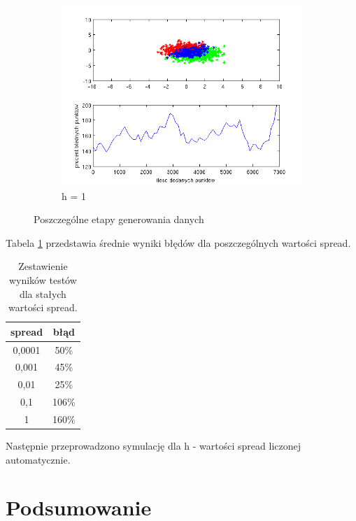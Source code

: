 \documentclass[10pt,a4paper]{article}
\begin{document}
\begin{figure}[h]
  \begin{center}
  \begin{subfigure}[b]{0.5\textwidth}
    \includegraphics[width=\textwidth]{test_h1.png}
    \caption{h = 1}
  \end{subfigure}
  \end{center}
  
  \caption{Poszczególne etapy generowania danych}
  \label{test_h}
  
\end{figure}

Tabela \ref{h_table} przedstawia średnie wyniki błędów dla poszczególnych wartości spread. 

\begin{table}[H]
\centering
\begin{tabular}{|c|c|}
\hline
spread & błąd \\
\hline
0,0001 & 50\%  \\
\hline
0,001 & 45\%  \\
\hline
0,01 & 25\%  \\
\hline
0,1 & 106\%  \\
\hline
1 & 160\%  \\
\hline
\end{tabular}
\caption{Zestawienie wyników testów dla stałych wartości spread.}
\label{h_table}
\end{table}
Następnie przeprowadzono symulację dla h - wartości spread liczonej automatycznie. 

\section{Podsumowanie}
\end{document}
